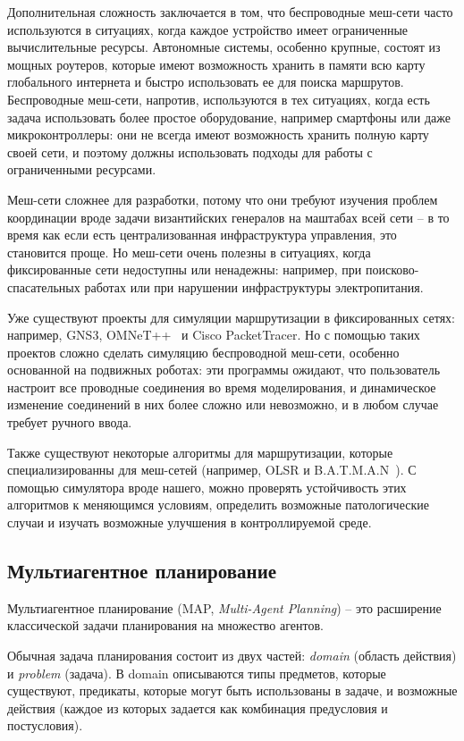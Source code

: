 \documentclass[%
]{article}
\begin{document}
Дополнительная сложность заключается в том, что
беспроводные меш-сети часто используются в ситуациях,
когда каждое устройство имеет ограниченные вычислительные ресурсы.
Автономные системы, особенно крупные,
состоят из мощных роутеров,
которые имеют возможность хранить в памяти всю карту глобального интернета
и быстро использовать ее для поиска маршрутов.
Беспроводные меш-сети, напротив, используются в тех ситуациях,
когда есть задача использовать более простое оборудование,
например смартфоны или даже микроконтроллеры:
они не всегда имеют возможность хранить полную карту своей сети,
и поэтому должны использовать подходы для работы с ограниченными ресурсами.

Меш-сети сложнее для разработки, потому что они требуют
изучения проблем координации вроде задачи византийских генералов на маштабах всей сети --
в то время как если есть централизованная инфраструктура управления, это становится проще.
Но меш-сети очень полезны в ситуациях, когда фиксированные сети недоступны или ненадежны:
например, при поисково-спасательных работах или при нарушении инфраструктуры электропитания.

Уже существуют проекты для симуляции маршрутизации в фиксированных сетях:
например, GNS3, OMNeT++~\cite{9181563} и Cisco PacketTracer.
Но с помощью таких проектов сложно сделать симуляцию беспроводной меш-сети,
особенно основанной на подвижных роботах:
эти программы ожидают, что пользователь настроит все проводные соединения
во время моделирования,
и динамическое изменение соединений в них более сложно или невозможно,
и в любом случае требует ручного ввода.

Также существуют некоторые алгоритмы для маршрутизации,
которые специализированны для меш-сетей
(например, OLSR и B.A.T.M.A.N~\cite{DBLP:journals/corr/abs-1901-02298}).
С помощью симулятора вроде нашего, можно проверять устойчивость этих алгоритмов к меняющимся условиям,
определить возможные патологические случаи
и изучать возможные улучшения
в контроллируемой среде.

\subsection{Мультиагентное планирование}

Мультиагентное планирование (MAP, \emph{Multi-Agent Planning}) --
это расширение классической задачи планирования
на множество агентов.

Обычная задача планирования состоит из двух частей:
\emph{domain} (область действия) и \emph{problem} (задача).
В domain описываются типы предметов, которые существуют,
предикаты, которые могут быть использованы в задаче,
и возможные действия (каждое из которых задается как комбинация предусловия и постусловия).
\end{document}
